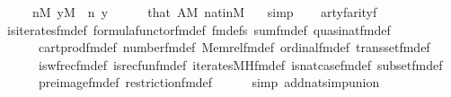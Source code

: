 \begin{isabellebody}
\ \ \ \ \ {\isachardoublequoteopen}n{\isasymin}M{\isachardoublequoteclose}\ {\isachardoublequoteopen}y{\isasymin}M{\isachardoublequoteclose}\ \ n\ y\isanewline
\ \ \ \ \isamarkupfalse%
\ that\ {\isacartoucheopen}A{\isasymin}M{\isacartoucheclose}\ nat{\isacharunderscore}{\kern0pt}in{\isacharunderscore}{\kern0pt}M\ {}\ \isamarkupfalse%
\ simp\isanewline
\ \ \isamarkupfalse%
\ artyf{\isacharcolon}{\kern0pt}{\isachardoublequoteopen}arity{\isacharparenleft}{\kern0pt}{\isacharquery}{\kern0pt}f{\isacharparenright}{\kern0pt}\ {\isacharequal}{\kern0pt}\ {}{\isachardoublequoteclose}\isanewline
\ \ \ \ \isamarkupfalse%
\ is{\isacharunderscore}{\kern0pt}iterates{\isacharunderscore}{\kern0pt}fm{\isacharunderscore}{\kern0pt}def\ formula{\isacharunderscore}{\kern0pt}functor{\isacharunderscore}{\kern0pt}fm{\isacharunderscore}{\kern0pt}def\ fm{\isacharunderscore}{\kern0pt}defs\ sum{\isacharunderscore}{\kern0pt}fm{\isacharunderscore}{\kern0pt}def\ quasinat{\isacharunderscore}{\kern0pt}fm{\isacharunderscore}{\kern0pt}def\isanewline
\ \ \ \ \ \ cartprod{\isacharunderscore}{\kern0pt}fm{\isacharunderscore}{\kern0pt}def\ number{}{\isacharunderscore}{\kern0pt}fm{\isacharunderscore}{\kern0pt}def\ Memrel{\isacharunderscore}{\kern0pt}fm{\isacharunderscore}{\kern0pt}def\ ordinal{\isacharunderscore}{\kern0pt}fm{\isacharunderscore}{\kern0pt}def\ transset{\isacharunderscore}{\kern0pt}fm{\isacharunderscore}{\kern0pt}def\isanewline
\ \ \ \ \ \ is{\isacharunderscore}{\kern0pt}wfrec{\isacharunderscore}{\kern0pt}fm{\isacharunderscore}{\kern0pt}def\ is{\isacharunderscore}{\kern0pt}recfun{\isacharunderscore}{\kern0pt}fm{\isacharunderscore}{\kern0pt}def\ iterates{\isacharunderscore}{\kern0pt}MH{\isacharunderscore}{\kern0pt}fm{\isacharunderscore}{\kern0pt}def\ is{\isacharunderscore}{\kern0pt}nat{\isacharunderscore}{\kern0pt}case{\isacharunderscore}{\kern0pt}fm{\isacharunderscore}{\kern0pt}def\ subset{\isacharunderscore}{\kern0pt}fm{\isacharunderscore}{\kern0pt}def\isanewline
\ \ \ \ \ \ pre{\isacharunderscore}{\kern0pt}image{\isacharunderscore}{\kern0pt}fm{\isacharunderscore}{\kern0pt}def\ restriction{\isacharunderscore}{\kern0pt}fm{\isacharunderscore}{\kern0pt}def\isanewline
\ \ \ \ \isamarkupfalse%
\ {\isacharparenleft}{\kern0pt}simp\ add{\isacharcolon}{\kern0pt}nat{\isacharunderscore}{\kern0pt}simp{\isacharunderscore}{\kern0pt}union{\isacharparenright}{\kern0pt}\isanewline
\ \ \isamarkupfalse%
\isanewline
\ \ \isamarkupfalse%

\end{isabellebody}
